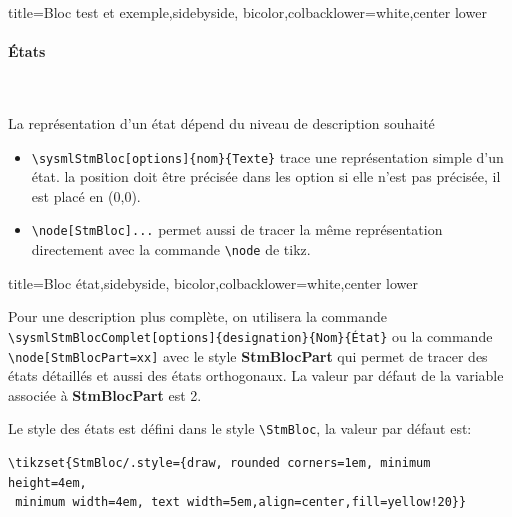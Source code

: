 \documentclass[a4paper,11pt]{article}                      %
\begin{document}
\begin{tcblisting}{title={Bloc test  et exemple},sidebyside, bicolor,colbacklower=white,center lower}
\end{tcblisting}

\paragraph{États}~\par

La représentation d'un état dépend du niveau de description souhaité

\begin{itemize}
\item \verb!\sysmlStmBloc[options]{nom}{Texte}!  trace une représentation simple  d'un état. la position doit être précisée dans les option si elle n'est pas précisée, il est placé en (0,0).

\item \verb!\node[StmBloc]...! permet aussi de tracer la même représentation directement avec la commande \verb!\node!  de tikz.
\end{itemize}

\begin{tcblisting}{title={Bloc état},sidebyside, bicolor,colbacklower=white,center lower}
\end{tcblisting}



Pour une description plus complète, on utilisera la commande \\
\verb!\sysmlStmBlocComplet[options]{designation}{Nom}{État}!  ou la commande  \verb!\node[StmBlocPart=xx]!  avec le style  \textbf{StmBlocPart}  qui permet de tracer  des états détaillés et aussi des états orthogonaux.  La valeur par défaut de la variable associée à  \textbf{StmBlocPart}   est 2.  

Le style des états  est défini dans le style \verb!\StmBloc!, la valeur  par défaut  est:\\
\begin{verbatim}
\tikzset{StmBloc/.style={draw, rounded corners=1em, minimum height=4em,
 minimum width=4em, text width=5em,align=center,fill=yellow!20}}
\end{verbatim}
\end{document}
